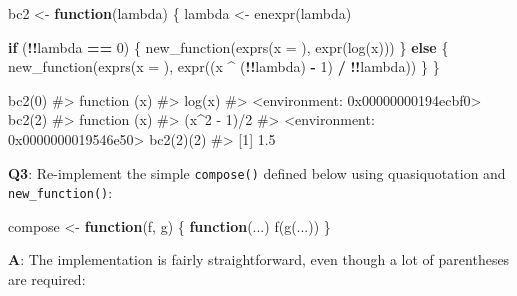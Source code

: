 \documentclass[
]{krantz}
\makeatletter
\newenvironment{Shaded}{\begin{snugshade}}{\end{snugshade}}
\newcommand{\CommentTok}[1]{\textcolor[rgb]{0.56,0.35,0.01}{\textit{#1}}}
\newcommand{\ControlFlowTok}[1]{\textcolor[rgb]{0.13,0.29,0.53}{\textbf{#1}}}
\newcommand{\DataTypeTok}[1]{\textcolor[rgb]{0.13,0.29,0.53}{#1}}
\newcommand{\DecValTok}[1]{\textcolor[rgb]{0.00,0.00,0.81}{#1}}
\newcommand{\KeywordTok}[1]{\textcolor[rgb]{0.13,0.29,0.53}{\textbf{#1}}}
\newcommand{\NormalTok}[1]{#1}
\newcommand{\OperatorTok}[1]{\textcolor[rgb]{0.81,0.36,0.00}{\textbf{#1}}}
\newcommand{\StringTok}[1]{\textcolor[rgb]{0.31,0.60,0.02}{#1}}
\newenvironment{kframe}{%
\medskip{}
\setlength{\fboxsep}{.8em}
 \def\at@end@of@kframe{}%
 \ifinner\ifhmode%
  \def\at@end@of@kframe{\end{minipage}}%
  \begin{minipage}{\columnwidth}%
 \fi\fi%
 \def\FrameCommand##1{\hskip\@totalleftmargin \hskip-\fboxsep
 \colorbox{shadecolor}{##1}\hskip-\fboxsep
     \hskip-\linewidth \hskip-\@totalleftmargin \hskip\columnwidth}%
 \MakeFramed {\advance\hsize-\width
   \@totalleftmargin\z@ \linewidth\hsize
   \@setminipage}}%
 {\par\unskip\endMakeFramed%
 \at@end@of@kframe}
\renewenvironment{Shaded}{\begin{kframe}}{\end{kframe}}
\renewcommand{\KeywordTok} [1]{\textcolor[rgb]{0.00,0.44,0.13}{{#1}}}
\renewcommand{\DataTypeTok}[1]{\textcolor[rgb]{0.56,0.13,0.00}{{#1}}}
\renewcommand{\DecValTok}  [1]{\textcolor[rgb]{0.25,0.63,0.44}{{#1}}}
\renewcommand{\StringTok}  [1]{\textcolor[rgb]{0.25,0.44,0.63}{{#1}}}
\renewcommand{\CommentTok} [1]{\textcolor[rgb]{0.38,0.63,0.69}{{#1}}}
\renewcommand{\NormalTok}  [1]{{#1}}
\makeatother
\begin{document}
\begin{Shaded}
\begin{Highlighting}[]
\NormalTok{bc2 <-}\StringTok{ }\ControlFlowTok{function}\NormalTok{(lambda) \{}
\NormalTok{  lambda <-}\StringTok{ }\KeywordTok{enexpr}\NormalTok{(lambda)}
  
  \ControlFlowTok{if}\NormalTok{ (}\OperatorTok{!!}\NormalTok{lambda }\OperatorTok{==}\StringTok{ }\DecValTok{0}\NormalTok{) \{}
    \KeywordTok{new_function}\NormalTok{(}\KeywordTok{exprs}\NormalTok{(}\DataTypeTok{x =}\NormalTok{ ), }\KeywordTok{expr}\NormalTok{(}\KeywordTok{log}\NormalTok{(x)))}
\NormalTok{  \} }\ControlFlowTok{else}\NormalTok{ \{}
    \KeywordTok{new_function}\NormalTok{(}\KeywordTok{exprs}\NormalTok{(}\DataTypeTok{x =}\NormalTok{ ), }\KeywordTok{expr}\NormalTok{((x }\OperatorTok{^}\StringTok{ }\NormalTok{(}\OperatorTok{!!}\NormalTok{lambda) }\OperatorTok{-}\StringTok{ }\DecValTok{1}\NormalTok{) }\OperatorTok{/}\StringTok{ }\OperatorTok{!!}\NormalTok{lambda))}
\NormalTok{  \}}
\NormalTok{\}}

\KeywordTok{bc2}\NormalTok{(}\DecValTok{0}\NormalTok{)}
\CommentTok{#> function (x) }
\CommentTok{#> log(x)}
\CommentTok{#> <environment: 0x00000000194ecbf0>}
\KeywordTok{bc2}\NormalTok{(}\DecValTok{2}\NormalTok{)}
\CommentTok{#> function (x) }
\CommentTok{#> (x^2 - 1)/2}
\CommentTok{#> <environment: 0x0000000019546e50>}
\KeywordTok{bc2}\NormalTok{(}\DecValTok{2}\NormalTok{)(}\DecValTok{2}\NormalTok{)}
\CommentTok{#> [1] 1.5}
\end{Highlighting}
\end{Shaded}

\textbf{{Q3}}: Re-implement the simple \texttt{compose()} defined below using quasiquotation and \texttt{new\_function()}:

\begin{Shaded}
\begin{Highlighting}[]
\NormalTok{compose <-}\StringTok{ }\ControlFlowTok{function}\NormalTok{(f, g) \{}
  \ControlFlowTok{function}\NormalTok{(...) }\KeywordTok{f}\NormalTok{(}\KeywordTok{g}\NormalTok{(...))}
\NormalTok{\}}
\end{Highlighting}
\end{Shaded}

\textbf{{A}}: The implementation is fairly straightforward, even though a lot of parentheses are required:
\end{document}

